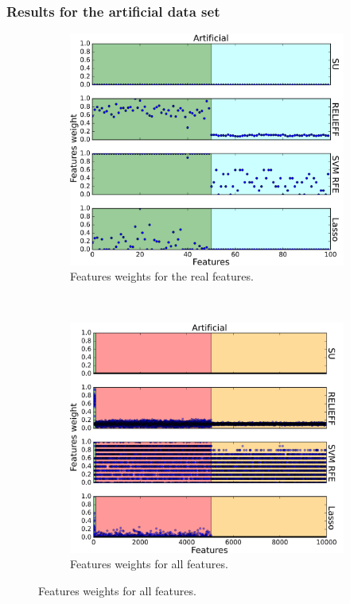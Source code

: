 \documentclass[twoside,11pt]{article}
\begin{document}
\subsubsection{Results for the artificial data set}
\begin{figure}
  \centering 
  \begin{subfigure}[b]{0.48\textwidth}
      \includegraphics[width=\textwidth]{feature_weights_plot_artificial_only_features.png}
      \caption{Features weights for the real features.}
      \label{fig:feature_weights_plot_artificial_only_features}
  \end{subfigure}
  ~
  \begin{subfigure}[b]{0.48\textwidth}
    \includegraphics[width=\textwidth]{feature_weights_plot_artificial_all.png}
      \caption{Features weights for all features.}
      \label{fig:feature_weights_plot_artificial_all}
  \end{subfigure}


\end{figure}
\end{document}
